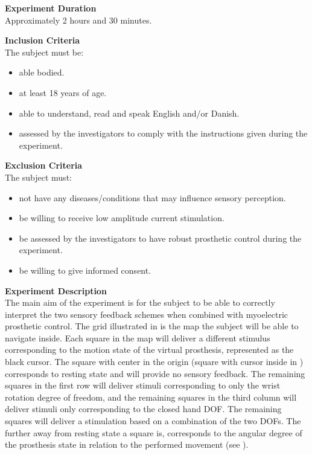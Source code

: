 \textbf{Experiment Duration} \\
Approximately 2 hours and 30 minutes.

\textbf{Inclusion Criteria} \\
The subject must be:
\vspace{-15pt}
\begin{itemize}
	\item able bodied. %
	\item at least 18 years of age.
	\item able to understand, read and speak English and/or Danish.
	\item assessed by the investigators to comply with the instructions given during the experiment.
\end{itemize}

\textbf{Exclusion Criteria} \\
The subject must:
\vspace{-15pt}
\begin{itemize}
	\item not have any diseases/conditions that may influence sensory perception.
	\item be willing to receive low amplitude current stimulation. 
	\item be assessed by the investigators to have robust prosthetic control during the experiment. 
	\item be willing to give informed consent. 
\end{itemize}

\textbf{{\Large Experiment Description}} \\
\newline
The main aim of the experiment is for the subject to be able to correctly interpret the two sensory feedback schemes when combined with myoelectric prosthetic control. The grid illustrated in  is the map the subject will be able to navigate inside. Each square in the map will deliver a different stimulus corresponding to the motion state of the virtual prosthesis, represented as the black cursor. The square with center in the origin (square with cursor inside in ) corresponds to resting state and will provide no sensory feedback. The remaining squares in the first row will deliver stimuli corresponding to only the wrist rotation degree of freedom, and the remaining squares in the third column will deliver stimuli only corresponding to the closed hand DOF. The remaining squares will deliver a stimulation based on a combination of the two DOFs. The further away from resting state a square is, corresponds to the angular degree of the prosthesis state in relation to the performed movement (see ). 

